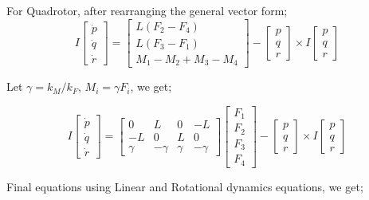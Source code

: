 For Quadrotor, after rearranging the general vector form;
\[
I\begin{bmatrix}
    \dot{p} \\
    \dot{q} \\
    \dot{r}
\end{bmatrix} = 
\begin{bmatrix}
    L(F_2 - F_4) \\
    L(F_3 - F_1) \\
    M_1 - M_2 + M_3 - M_4
\end{bmatrix} - 
\begin{bmatrix}
    p \\
    q \\
    r
\end{bmatrix}
\times I\begin{bmatrix}
    p \\
    q \\
    r
\end{bmatrix}
\]

Let $\gamma = k_M/k_F$, $M_i = \gamma F_i$, we get;

\[
I\begin{bmatrix}
    \dot{p} \\
    \dot{q} \\
    \dot{r}
\end{bmatrix} = 
\begin{bmatrix}
    0 & L & 0 & -L \\
    -L & 0 & L & 0 \\
    \gamma & -\gamma & \gamma & -\gamma
\end{bmatrix}
\begin{bmatrix}
    F_1 \\
    F_2 \\
    F_3 \\
    F_4
\end{bmatrix}- 
\begin{bmatrix}
    p \\
    q \\
    r
\end{bmatrix}
\times I\begin{bmatrix}
    p \\
    q \\
    r
\end{bmatrix}
\]

Final equations using Linear and Rotational dynamics equations, we get;

